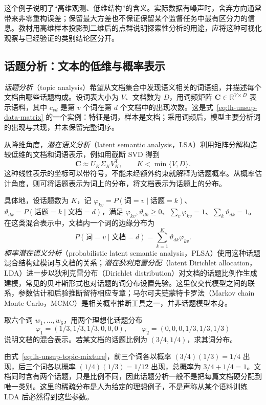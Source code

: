 这个例子说明了“高维观测、低维结构”的含义。实际数据有噪声时，舍弃方向通常带来非零重构误差；保留最大方差也不保证保留某个监督任务中最有区分力的信息。教材用高维样本投影到二维后的点群说明探索性分析的用途，应将这种可视化观察与已经验证的类别结论区分开。

\subsection{话题分析：文本的低维与概率表示}
\label{subsec:lh-unsup-topic-analysis}

\emph{话题分析}（topic analysis）希望从文档集合中发现语义相关的词语组，并描述每个文档由哪些话题构成。设词表大小为 $V$、文档数为 $D$，用词频矩阵 $\mathbf C\in\mathbb R^{V\times D}$ 表示语料，其中 $c_{vd}$ 是第 $v$ 个词在第 $d$ 个文档中的出现次数。这是式~\eqref{eq:lh-unsup-data-matrix} 的一个实例：特征是词，样本是文档；采用词频后，模型主要分析词的出现与共现，并未保留完整词序。

从降维角度，\emph{潜在语义分析}（latent semantic analysis，LSA）利用矩阵分解构造较低维的文档和词语表示，例如用截断 SVD 得到
\[
\mathbf C\approx U_K\Sigma_KV_K^{\mathsf T},
\qquad K<\min\{V,D\}.
\]
这种线性表示的坐标可以带符号，不能未经额外约束就解释为话题概率。从概率估计角度，则可将话题表示为词上的分布，将文档表示为话题上的分布。

具体地，设话题数为 $K$，记 $\varphi_{kv}=P(\text{词}=v\mid\text{话题}=k)$、$\vartheta_{dk}=P(\text{话题}=k\mid\text{文档}=d)$，满足 $\varphi_{kv},\vartheta_{dk}\geq0$、$\sum_v\varphi_{kv}=1$、$\sum_k\vartheta_{dk}=1$。在这类混合表示中，文档内一个词的边缘分布为
\begin{equation}
P(\text{词}=v\mid\text{文档}=d)
=\sum_{k=1}^K\vartheta_{dk}\varphi_{kv}.
\label{eq:lh-unsup-topic-mixture}
\end{equation}
\emph{概率潜在语义分析}（probabilistic latent semantic analysis，PLSA）使用这种话题混合结构建模词与文档的关系；\emph{潜在狄利克雷分配}（latent Dirichlet allocation，LDA）进一步以狄利克雷分布（Dirichlet distribution）对文档的话题比例作生成建模，常见的贝叶斯形式也对话题的词分布设置先验。这里仅交代模型之间的联系，参数估计和后验推断留待相应专章；马尔可夫链蒙特卡罗法（Markov chain Monte Carlo，MCMC）是相关概率推断工具之一，并非话题模型本身。

\begin{example}
\label{ex:lh-unsup-topic-mixture}
取六个词 $w_1,\ldots,w_6$，用两个理想化话题分布
\[
\varphi_1=(1/3,1/3,1/3,0,0,0),\qquad
\varphi_2=(0,0,0,1/3,1/3,1/3)
\]
说明文档的混合表示。若某文档的话题比例为 $(3/4,1/4)$，求其词分布。
\end{example}
\begin{solve}
由式~\eqref{eq:lh-unsup-topic-mixture}，前三个词各以概率 $(3/4)(1/3)=1/4$ 出现，后三个词各以概率 $(1/4)(1/3)=1/12$ 出现，总概率为 $3/4+1/4=1$。文档同时含有两个话题，只是比例不同，因此话题分析一般不是把每篇文档硬分配到唯一类别。这里的稀疏分布是人为给定的理想例子，不是声称从某个语料训练 LDA 后必然得到这些参数。
\end{solve}

